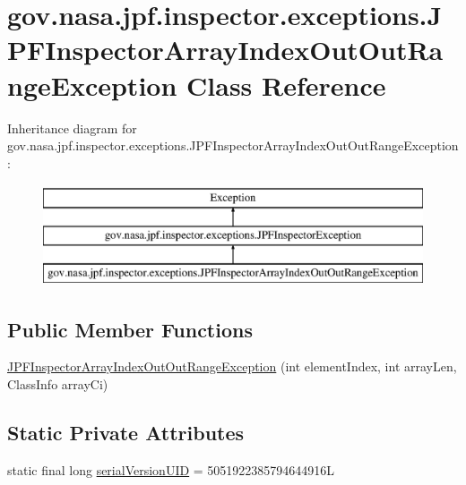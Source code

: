 \hypertarget{classgov_1_1nasa_1_1jpf_1_1inspector_1_1exceptions_1_1_j_p_f_inspector_array_index_out_out_range_exception}{}\section{gov.\+nasa.\+jpf.\+inspector.\+exceptions.\+J\+P\+F\+Inspector\+Array\+Index\+Out\+Out\+Range\+Exception Class Reference}
\label{classgov_1_1nasa_1_1jpf_1_1inspector_1_1exceptions_1_1_j_p_f_inspector_array_index_out_out_range_exception}
Inheritance diagram for gov.\+nasa.\+jpf.\+inspector.\+exceptions.\+J\+P\+F\+Inspector\+Array\+Index\+Out\+Out\+Range\+Exception\+:\begin{figure}[H]
\begin{center}
\leavevmode
\includegraphics[height=3.000000cm]{classgov_1_1nasa_1_1jpf_1_1inspector_1_1exceptions_1_1_j_p_f_inspector_array_index_out_out_range_exception}
\end{center}
\end{figure}
\subsection*{Public Member Functions}
\begin{DoxyCompactItemize}
\item 
\hyperlink{classgov_1_1nasa_1_1jpf_1_1inspector_1_1exceptions_1_1_j_p_f_inspector_array_index_out_out_range_exception_a36691395ef03d5f74d6c10890fdeec9c}{J\+P\+F\+Inspector\+Array\+Index\+Out\+Out\+Range\+Exception} (int element\+Index, int array\+Len, Class\+Info array\+Ci)
\end{DoxyCompactItemize}
\subsection*{Static Private Attributes}
\begin{DoxyCompactItemize}
\item 
static final long \hyperlink{classgov_1_1nasa_1_1jpf_1_1inspector_1_1exceptions_1_1_j_p_f_inspector_array_index_out_out_range_exception_a87258c3e45651bee3eab6ddc508f962c}{serial\+Version\+U\+ID} = 5051922385794644916L
\end{DoxyCompactItemize}


